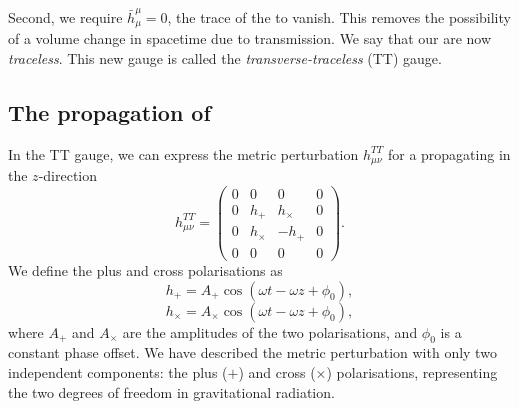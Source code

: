 Second, we require $\bar{h}^{\mu}_{\mu} = 0$, the trace of the \gw to vanish. This removes the possibility of a volume change in spacetime due to \gwadj transmission. We say that our \gws are now \textit{traceless}. This new gauge is called the \textit{transverse-traceless} (TT) gauge.

\subsection{\label{1:sec:gravitational-propagation}The propagation of \gws}

In the TT gauge, we can express the metric perturbation $h^{TT}_{\mu\nu}$ for a \gw propagating in the $z$-direction
%
\begin{equation}
   h^{TT}_{\mu \nu} =
   \begin{pmatrix}
      0 & 0 & 0 & 0 \\
      0 & h_+ & h_\times & 0 \\
      0 & h_\times & -h_+ & 0 \\
      0 & 0 & 0 & 0
   \end{pmatrix}.
   \label{1:eqn:h_TT}
\end{equation}
%
We define the plus and cross polarisations as
%
\begin{equation}
    h_+ = A_+ \cos(\omega t - \omega z + \phi_{0}),
    \label{1:eq:h_+_cos}
\end{equation}
%
\begin{equation}
    h_{\times} = A_{\times} \cos(\omega t - \omega z + \phi_{0}),
\end{equation}
%
where $A_+$ and $A_\times$ are the amplitudes of the two polarisations, and $\phi_{0}$ is a constant phase offset. We have described the metric perturbation with only two independent components: the plus ($+$) and cross ($\times$) polarisations, representing the two degrees of freedom in gravitational radiation.

